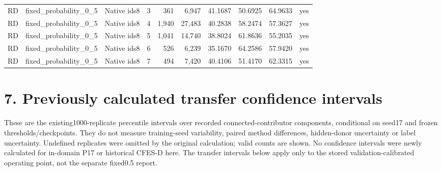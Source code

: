 \documentclass[10pt]{article}
\begin{document}
\begin{longtable}{@{}lrrrrrrrrr@{}}
RD & fixed\_probability\_0\_5 & Native ids8 & 3 & 361 & 6,947 & 41.1687 & 50.6925 & 64.9633 & yes \\
RD & fixed\_probability\_0\_5 & Native ids8 & 4 & 1,940 & 27,483 & 40.2838 & 58.2474 & 57.3627 & yes \\
RD & fixed\_probability\_0\_5 & Native ids8 & 5 & 1,041 & 14,740 & 38.8024 & 61.8636 & 55.2035 & yes \\
RD & fixed\_probability\_0\_5 & Native ids8 & 6 & 526 & 6,239 & 35.1670 & 64.2586 & 57.9420 & yes \\
RD & fixed\_probability\_0\_5 & Native ids8 & 7 & 494 & 7,420 & 40.4106 & 51.4170 & 62.3315 & yes \\
\end{longtable}

\section*{7. Previously calculated transfer confidence intervals}
These are the existing1000-replicate percentile intervals over recorded connected-contributor components, conditional on seed17 and frozen thresholds/checkpoints. They do not measure training-seed variability, paired method differences, hidden-donor uncertainty or label uncertainty. Undefined replicates were omitted by the original calculation; valid counts are shown. No confidence intervals were newly calculated for in-domain P17 or historical CFES-D here. The transfer intervals below apply only to the stored validation-calibrated operating point, not the separate fixed0.5 report.
\end{document}
